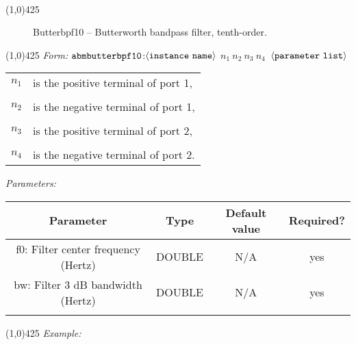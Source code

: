 \documentclass{article}
\begin{document}
\\
\hrulefill \linethickness{0.5mm}\line(1,0){425}
\normalsize
\newline
\begin{figure}[h]
\centerline{\epsfxsize=2.5in }
\caption{Butterbpf10 -- Butterworth bandpass filter, tenth-order.}
\end{figure}
\newline
\linethickness{0.5mm}\line(1,0){425}
\newline %
\textit{Form:} $\tt abmbutterbpf10$:$\langle \tt{instance\
name}\rangle$ $n_1\ n_2\ n_3\ n_4\ $ $\langle \tt{parameter\
list}\rangle$
\newline
\begin{tabular}{r l}
$n_1$ & is the positive terminal of port 1, \\
&  \\
$n_2$ & is the negative terminal of port 1, \\
&  \\
$n_3$ & is the positive terminal of port 2, \\
&  \\
$n_4$ & is the negative terminal of port 2. \\
\end{tabular}
\newline
\textit{Parameters:}%
\begin{table}[H]
\begin{tabular}{|c|c|c|c|}
\hline
Parameter&Type&Default value&Required?\\
\hline
f0: Filter center frequency (Hertz) & DOUBLE & N/A & yes \\
\hline
bw: Filter 3 dB bandwidth (Hertz) & DOUBLE & N/A & yes \\
\par
\hline
\end{tabular}
\end{table}
\noindent\linethickness{0.5mm}\line(1,0){425}
\newline
\textit{Example:}%
\end{document}
